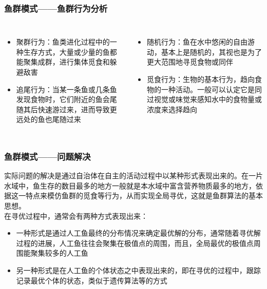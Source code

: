 \begin{frame}
	\frametitle{鱼群模式——鱼群行为分析}
	\begin{columns}
		\begin{itemize}
			\item{聚群行为：鱼类进化过程中的一种生存方式，大量或少量的鱼都能聚集成群，进行集体觅食和躲避敌害}
			\item{追尾行为：当某一条鱼或几条鱼发现食物时，它们附近的鱼会尾随其后快速游过来，进而导致更远处的鱼也尾随过来}
		\end{itemize}
		\begin{itemize}
			\item{随机行为：鱼在水中悠闲的自由游动，基本上是随机的，其视也是为了更大范围地寻觅食物或同伴}
			\item{觅食行为：生物的基本行为，趋向食物的一种活动。一般可以认定它是同过视觉或味觉来感知水中的食物量或浓度来选择趋向}
		\end{itemize}
	\end{columns}
\end{frame}
\begin{frame}
	\frametitle{鱼群模式——问题解决}
	实际问题的解决是通过自治体在自主的活动过程中以某种形式表现出来的。在一片水域中，鱼生存的数目最多的地方一般就是本水域中富含营养物质最多的地方，依据这一特点来模仿鱼群的觅食等行为，从而实现全局寻优，这就是鱼群算法的基本思想。\\在寻优过程中，通常会有两种方式表现出来：
	\begin{itemize}
		\item{一种形式是通过人工鱼最终的分布情况来确定最优解的分布，通常随着寻优解过程的进展，人工鱼往往会聚集在极值点的周围，而且，全局最优的极值点周围能聚集较多的人工鱼}
		\item{另一种形式是在人工鱼的个体状态之中表现出来的，即在寻优的过程中，跟踪记录最优个体的状态，类似于遗传算法等的方式}
	\end{itemize}
\end{frame}

